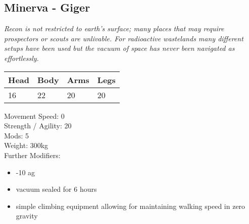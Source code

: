 \documentclass[12pt,a4paper,openany]{book}
\begin{document}
	\subsection{Minerva - Giger}
	\textit{Recon is not restricted to earth's surface; many places that may require prospectors or scouts are unlivable. For radioactive wastelands many different setups have been used but the vacuum of space has never been navigated as effortlessly.}\par
	\begin{tabular}{|l|l|l|l|}
		\hline
		Head & Body & Arms & Legs\\
		\hline
		16 & 22 & 20 & 20\\
		\hline
	\end{tabular}
	\par
	Movement Speed: 0\\
	Strength / Agility: 20\\
	Mods: 5\\
	Weight: 300kg\\
	Further Modifiers:
	\vspace{-8mm}
	\begin{itemize}
		\setlength\itemsep{-8mm}
		\item -10 ag
		\item vacuum sealed for 6 hours
		\item simple climbing equipment allowing for maintaining walking speed in zero gravity
	\end{itemize}
	\par
	
	
\end{document}
